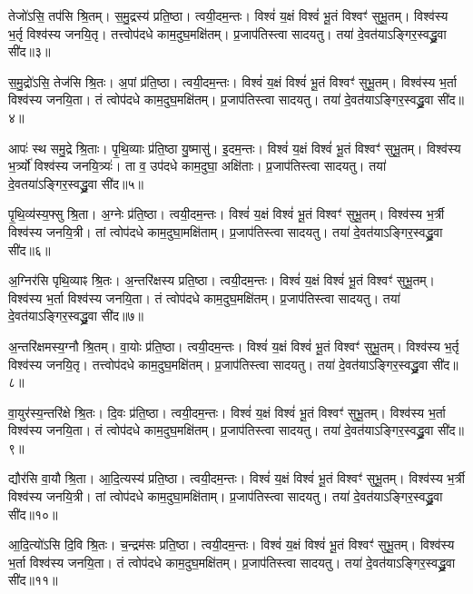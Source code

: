    तेजो॑ऽसि॒ तप॑सि श्रि॒तम्।
   स॒मु॒द्रस्य॑ प्रति॒ष्ठा।
   त्वयी॒दम॒न्तः।
   विश्वं॑ य॒क्षं विश्वं॑ भू॒तं विश्वꣳ॑ सुभू॒तम्।
   विश्व॑स्य भ॒र्तृ विश्व॑स्य जनयि॒तृ।
   तत्त्वोप॑दधे काम॒दुघ॒मक्षि॑तम्।
   प्र॒जाप॑तिस्त्वा सादयतु।
   तया॑ दे॒वत॑याऽङ्गिर॒स्वद्ध्रु॒वा सी॑द॥३॥

   स॒मु॒द्रो॑ऽसि॒ तेज॑सि श्रि॒तः।
   अ॒पां प्र॑ति॒ष्ठा।
   त्वयी॒दम॒न्तः।
   विश्वं॑ य॒क्षं विश्वं॑ भू॒तं विश्वꣳ॑ सुभू॒तम्।
   विश्व॑स्य भ॒र्ता विश्व॑स्य जनयि॒ता।
   तं त्वोप॑दधे काम॒दुघ॒मक्षि॑तम्।
   प्र॒जाप॑तिस्त्वा सादयतु।
   तया॑ दे॒वत॑याऽङ्गिर॒स्वद्ध्रु॒वा सी॑द॥४॥

   आपः॑ स्थ समु॒द्रे श्रि॒ताः।
   पृ॒थि॒व्याः प्र॑ति॒ष्ठा यु॒ष्मासु॑।
   इ॒दम॒न्तः।
   विश्वं॑ य॒क्षं विश्वं॑ भू॒तं विश्वꣳ॑ सुभू॒तम्।
   विश्व॑स्य भ॒र्त्र्यो॑ विश्व॑स्य जनयि॒त्र्यः॑।
   ता व॒ उप॑दधे काम॒दुघा॒ अक्षि॑ताः।
   प्र॒जाप॑तिस्त्वा सादयतु।
   तया॑ दे॒वतया॑ऽङ्गिर॒स्वद्ध्रु॒वा सी॑द॥५॥

   पृ॒थि॒व्य॑स्य॒फ्सु श्रि॒ता।
   अ॒ग्नेः प्र॑ति॒ष्ठा।
   त्वयी॒दम॒न्तः।
   विश्वं॑ य॒क्षं विश्वं॑ भू॒तं विश्वꣳ॑ सुभू॒तम्।
   विश्व॑स्य भ॒र्त्री विश्व॑स्य जनयि॒त्री।
   तां त्वोप॑दधे काम॒दुघा॒मक्षि॑ताम्।
   प्र॒जाप॑तिस्त्वा सादयतु।
   तया॑ दे॒वत॑याऽङ्गिर॒स्वद्ध्रु॒वा सी॑द॥६॥

   अ॒ग्निर॑सि पृथि॒व्याꣴ श्रि॒तः।
   अ॒न्तरि॑क्षस्य प्रति॒ष्ठा।
   त्वयी॒दम॒न्तः।
   विश्वं॑ य॒क्षं विश्वं॑ भू॒तं विश्वꣳ॑ सुभू॒तम्।
   विश्व॑स्य भ॒र्ता विश्व॑स्य जनयि॒ता।
   तं त्वोप॑दधे काम॒दुघ॒मक्षि॑तम्।
   प्र॒जाप॑तिस्त्वा सादयतु।
   तया॑ दे॒वत॑याऽङ्गिर॒स्वद्ध्रु॒वा सी॑द॥७॥

   अ॒न्तरि॑क्षमस्य॒ग्नौ श्रि॒तम्।
   वा॒योः प्र॑ति॒ष्ठा।
   त्वयी॒दम॒न्तः।
   विश्वं॑ य॒क्षं विश्वं॑ भू॒तं विश्वꣳ॑ सुभू॒तम्।
   विश्व॑स्य भ॒र्तृ विश्व॑स्य जनयि॒तृ।
   तत्त्वोप॑दधे काम॒दुघ॒मक्षि॑तम्।
   प्र॒जाप॑तिस्त्वा सादयतु।
   तया॑ दे॒वत॑याऽङ्गिर॒स्वद्ध्रु॒वा सी॑द॥८॥

   वा॒युर॑स्य॒न्तरि॑क्षे श्रि॒तः।
   दि॒वः प्र॑ति॒ष्ठा।
   त्वयी॒दम॒न्तः।
   विश्वं॑ य॒क्षं विश्वं॑ भू॒तं विश्वꣳ॑ सुभू॒तम्।
   विश्व॑स्य भ॒र्ता विश्व॑स्य जनयि॒ता।
   तं त्वोप॑दधे काम॒दुघ॒मक्षि॑तम्।
   प्र॒जाप॑तिस्त्वा सादयतु।
   तया॑ दे॒वत॑याऽङ्गिर॒स्वद्ध्रु॒वा सी॑द॥९॥

   द्यौर॑सि वा॒यौ श्रि॒ता।
   आ॒दि॒त्यस्य॑ प्रति॒ष्ठा।
   त्वयी॒दम॒न्तः।
   विश्वं॑ य॒क्षं विश्वं॑ भू॒तं विश्वꣳ॑ सुभू॒तम्।
   विश्व॑स्य भ॒र्त्री विश्व॑स्य जनयि॒त्री।
   तां त्वोप॑दधे काम॒दुघा॒मक्षि॑ताम्।
   प्र॒जाप॑तिस्त्वा सादयतु।
   तया॑ दे॒वत॑याऽङ्गिर॒स्वद्ध्रु॒वा सी॑द॥१०॥

   आ॒दि॒त्यो॑ऽसि दि॒वि श्रि॒तः।
   च॒न्द्रम॑सः प्रति॒ष्ठा।
   त्वयी॒दम॒न्तः।
   विश्वं॑ य॒क्षं विश्वं॑ भू॒तं विश्वꣳ॑ सुभू॒तम्।
   विश्व॑स्य भ॒र्ता विश्व॑स्य जनयि॒ता।
   तं त्वोप॑दधे काम॒दुघ॒मक्षि॑तम्।
   प्र॒जाप॑तिस्त्वा सादयतु।
   तया॑ दे॒वत॑याऽङ्गिर॒स्वद्ध्रु॒वा सी॑द॥११॥

